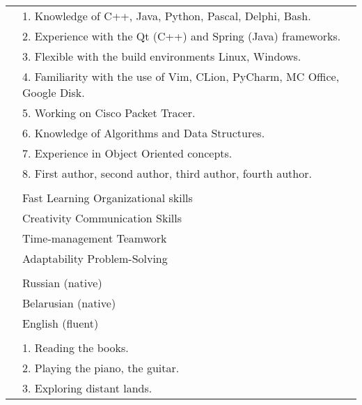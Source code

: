 \documentclass[letterpaper, 11pt]{article}
\begin{document}
\begin{longtable}{p{1.3in}p{4.8in}}
\nohyphens{\color{OliveGreen}{Technical skills}}
& 1. Knowledge of C++, Java, Python, Pascal, Delphi, Bash. \\
& 2. Experience with the Qt (C++) and Spring (Java) frameworks. \\
& 3. Flexible with the build environments Linux, Windows. \\
& 4. Familiarity with the use of Vim, CLion, PyCharm, MC Office, Google Disk. \\
& 5. Working on Cisco Packet Tracer. \\
& 6. Knowledge of Algorithms and Data Structures. \\
& 7. Experience in Object Oriented concepts. \\
& 8. First author, second author, third author, fourth author. \\
& \\


\nohyphens{\color{OliveGreen}{Soft skills}} 
& Fast Learning \hfill Organizational skills \\
& Creativity \hfill Communication Skills \\
& Time-management \hfill Teamwork \\  
& Adaptability \hfill Problem-Solving \\
& \\


{\color{OliveGreen}{Languages}} 
& Russian (native) \\
& Belarusian (native) \\
& English (fluent) \\
& \\


\nohyphens{\color{OliveGreen}{Other interests}} 
& 1. Reading the books. \\
& 2. Playing the piano, the guitar. \\
& 3. Exploring distant lands.\\


\end{longtable}
\end{document}
